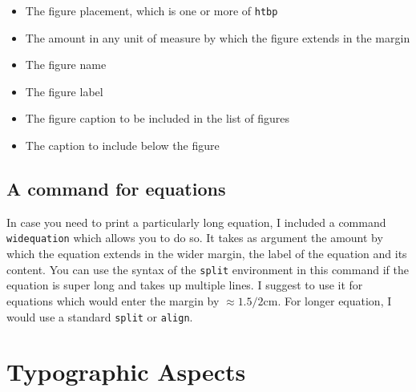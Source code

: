 \begin{itemize}
	\item  The figure placement, which is one or more of \texttt{htbp}
	\item The amount in any unit of measure by which the figure extends in the margin
	\item The figure name
	\item The figure label
	\item The figure caption to be included in the list of figures
	\item The caption to include below the figure
\end{itemize}

\subsection{A command for equations}

In case you need to print a particularly long equation, I included a command \texttt{\\widequation} which allows you to do so. It takes as argument the amount by which the equation extends in the wider margin, the label of the equation and its content. You can use the syntax of the \texttt{split} environment in this command if the equation is super long and takes up multiple lines. I suggest to use it for equations which would enter the margin by $\approx 1.5/2$cm. For longer equation, I would use a standard \texttt{split} or \texttt{align}.

\section{Typographic Aspects}

